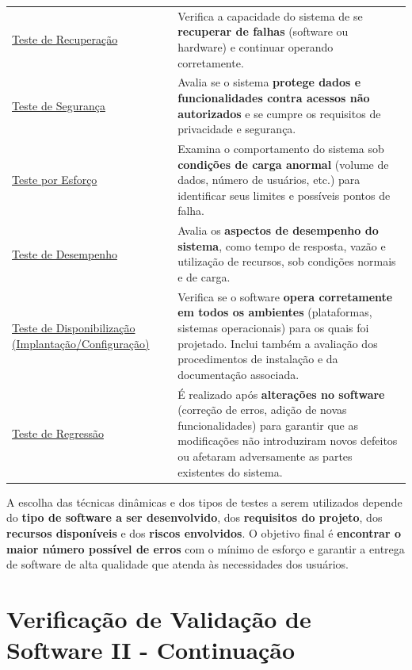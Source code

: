 \documentclass[
]{book}
\begin{document}
\begin{longtable}[]{@{}
  >{\centering\arraybackslash}p{}
  >{\raggedright\arraybackslash}p{}@{}}
\toprule\noalign{}
\endhead
\bottomrule\noalign{}
\endlastfoot
\ul{Teste de Recuperação} & Verifica a capacidade do sistema de se \textbf{recuperar de falhas} (software ou hardware) e continuar operando corretamente. \\
\ul{Teste de Segurança} & Avalia se o sistema \textbf{protege dados e funcionalidades contra acessos não autorizados} e se cumpre os requisitos de privacidade e segurança. \\
\ul{Teste por Esforço} & Examina o comportamento do sistema sob \textbf{condições de carga anormal} (volume de dados, número de usuários, etc.) para identificar seus limites e possíveis pontos de falha. \\
\ul{Teste de Desempenho} & Avalia os \textbf{aspectos de desempenho do sistema}, como tempo de resposta, vazão e utilização de recursos, sob condições normais e de carga. \\
\ul{Teste de Disponibilização (Implantação/Configuração)} & Verifica se o software \textbf{opera corretamente em todos os ambientes} (plataformas, sistemas operacionais) para os quais foi projetado. Inclui também a avaliação dos procedimentos de instalação e da documentação associada. \\
\ul{Teste de Regressão} & É realizado após \textbf{alterações no software} (correção de erros, adição de novas funcionalidades) para garantir que as modificações não introduziram novos defeitos ou afetaram adversamente as partes existentes do sistema. \\
\end{longtable}

A escolha das técnicas dinâmicas e dos tipos de testes a serem utilizados depende do \textbf{tipo de software a ser desenvolvido}, dos \textbf{requisitos do projeto}, dos \textbf{recursos disponíveis} e dos \textbf{riscos envolvidos}. O objetivo final é \textbf{encontrar o maior número possível de erros} com o mínimo de esforço e garantir a entrega de software de alta qualidade que atenda às necessidades dos usuários.

\chapter{Verificação de Validação de Software II - Continuação}\label{verificauxe7uxe3o-de-validauxe7uxe3o-de-software-ii---continuauxe7uxe3o}
\end{document}

